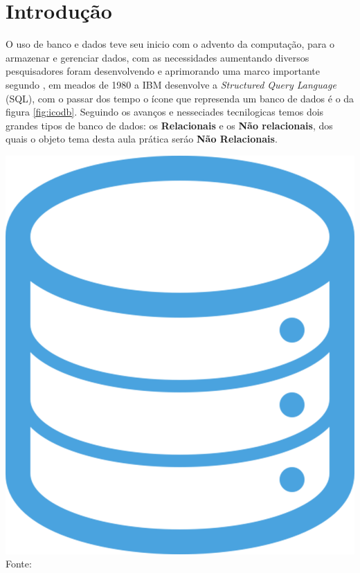 
\section{Introdução}


\noindent \begin{minipage}[c]{0.6\textwidth}
\par O uso de banco e dados teve seu inicio com o advento da computação, para o armazenar e gerenciar dados, com as necessidades aumentando diversos pesquisadores foram desenvolvendo e aprimorando uma marco importante segundo \cite{histdb:2024}, em meados de 1980 a IBM desenvolve a \textit{Structured Query Language} (SQL), com o passar dos tempo o ícone que represenda um banco de dados é o da figura \ref{fig:icodb}. Seguindo os avanços e nesseciades tecnilogicas temos dois grandes tipos de banco de dados: os \textbf{Relacionais} e os \textbf{Não relacionais}, dos quais o objeto tema desta aula prática seráo \textbf{Não Relacionais}.


\end{minipage}
\begin{minipage}[c]{0.4\textwidth}
  \includegraphics[width=\textwidth]{figure/pngegg.png}
  \label{fig:icodb}
  {\fontsize{10pt}{\baselineskip}\selectfont
    Fonte: }
\end{minipage}


